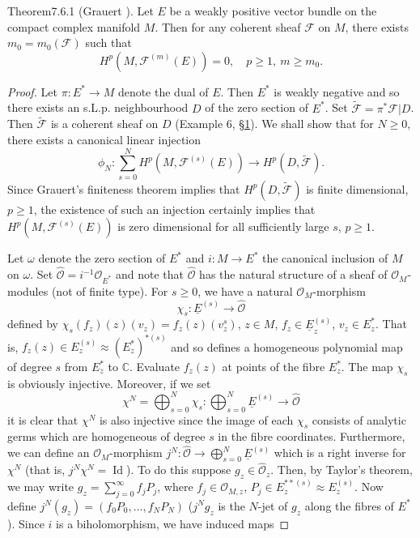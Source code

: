 \begin{originaltheorem}{Theorem}{7.6.1}
(Grauert \cite{bib:II:grauert-h:1}). Let $E$ be a weakly positive vector bundle on the compact complex manifold $M$. Then for any coherent sheaf $\mathcal{F}$ on $M$, there exists $m_0=m_0(\mathcal{F})$ such that
\[
H^p(M,\mathcal{F}^{(m)}(E))=0,\quad p\geq1,\ m\geq m_0.
\]
\end{originaltheorem}
\begin{proof}
Let $\pi:E^*\to M$ denote the dual of $E$. Then $E^*$ is weakly negative and so there exists an s.L.p. neighbourhood $D$ of the zero section of $E^*$. Set $\widetilde{\mathcal{F}}=\pi^*\mathcal{F}|D$. Then $\widetilde{\mathcal{F}}$ is a coherent sheaf on $D$ (Example 6, \hyperref[sec:7:1]{\S1}). We shall show that for $N\geq0$, there exists a canonical linear injection
\[
\phi_N:\sum_{s=0}^N H^p(M,\mathcal{F}^{(s)}(E))\longrightarrow H^p(D,\widetilde{\mathcal{F}}).
\]
Since Grauert's finiteness theorem implies that $H^p(D,\widetilde{\mathcal{F}})$ is finite dimensional, $p\geq1$, the existence of such an injection certainly implies that $H^p(M,\mathcal{F}^{(s)}(E))$ is zero dimensional for all sufficiently large $s$, $p\geq1$.

Let $\omega$ denote the zero section of $E^*$ and $i:M\to E^*$ the canonical inclusion of $M$ on $\omega$. Set $\widehat{\mathcal{O}}=i^{-1}\mathcal{O}_{E^*}$ and note that $\widehat{\mathcal{O}}$ has the natural structure of a sheaf of $\mathcal{O}_M$-modules (not of finite type). For $s\geq0$, we have a natural $\mathcal{O}_M$-morphism
\[
\chi_s:\underline{E}^{(s)}\longrightarrow\widehat{\mathcal{O}}
\]
defined by $\chi_s(f_z)(z)(v_z)=f_z(z)(v_z^s)$, $z\in M$, $f_z\in\underline{E}_z^{(s)}$, $v_z\in E_z^*$. That is, $f_z(z)\in E_z^{(s)}\approx(E_z^*)^{*(s)}$ and so defines a homogeneous polynomial map of degree $s$ from $E_z^*$ to $\mathbb{C}$. Evaluate $f_z(z)$ at points of the fibre $E_z^*$. The map $\chi_s$ is obviously injective. Moreover, if we set
\[
\chi^N=\bigoplus_{s=0}^N\chi_s:\bigoplus_{s=0}^N\underline{E}^{(s)}\longrightarrow\widehat{\mathcal{O}}
\]
it is clear that $\chi^N$ is also injective since the image of each $\chi_s$ consists of analytic germs which are homogeneous of degree $s$ in the fibre coordinates. Furthermore, we can define an $\mathcal{O}_M$-morphism $j^N:\widehat{\mathcal{O}}\to\bigoplus_{s=0}^N\underline{E}^{(s)}$ which is a right inverse for $\chi^N$ (that is, $j^N\chi^N=\operatorname{Id}$). To do this suppose $g_z\in\widehat{\mathcal{O}}_z$. Then, by Taylor's theorem, we may write $g_z=\sum_{j=0}^\infty f_jP_j$, where $f_j\in\mathcal{O}_{M,z}$, $P_j\in E_z^{**(s)}\approx E_z^{(s)}$. Now define $j^N(g_z)=(f_0P_0,\ldots,f_NP_N)$ ($j^Ng_z$ is the $N$-jet of $g_z$ along the fibres of $E^*$). Since $i$ is a biholomorphism, we have induced maps


\end{proof}
